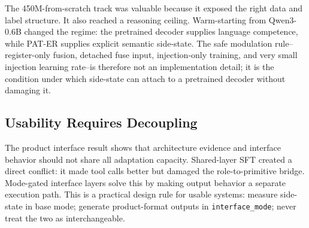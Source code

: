 The 450M-from-scratch track was valuable because it exposed the right data and
label structure. It also reached a reasoning ceiling. Warm-starting from
Qwen3-0.6B changed the regime: the pretrained decoder supplies language
competence, while PAT-ER supplies explicit semantic side-state. The safe
modulation rule--register-only fusion, detached fuse input, injection-only
training, and very small injection learning rate--is therefore not an
implementation detail; it is the condition under which side-state can attach to
a pretrained decoder without damaging it.

\subsection{Usability Requires Decoupling}

The product interface result shows that architecture evidence and interface
behavior should not share all adaptation capacity. Shared-layer SFT created a
direct conflict: it made tool calls better but damaged the role-to-primitive
bridge. Mode-gated interface layers solve this by making output behavior a
separate execution path. This is a practical design rule for usable systems:
measure side-state in base mode; generate product-format outputs in
\texttt{interface\_mode}; never treat the two as interchangeable.

